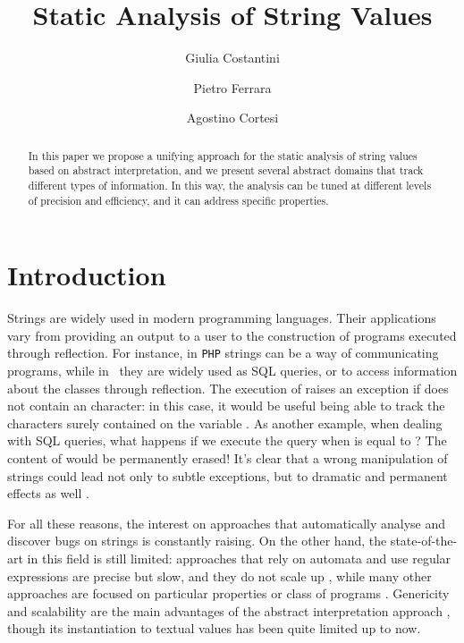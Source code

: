 \documentclass[orivec]{llncs}
\title{Static Analysis of String Values}
\author{ 
Giulia Costantini\inst{1} \and Pietro Ferrara\inst{2} \and Agostino Cortesi\inst{1}}
\institute{University Ca' Foscari of Venice, Italy\\\mailgiuliatino \and ETH Zurich, Switzerland\\\mailpietro}
\begin{document}
\maketitle
 
\begin{abstract}
In this paper we propose a unifying approach for the static analysis of string values based on abstract interpretation, and we present several abstract domains that track different types of information. In this way, the analysis can be tuned at different levels of precision and efficiency, and it can address specific properties.
\end{abstract}
 
\section{Introduction}

Strings are widely used in modern programming languages. Their applications vary from providing an output to a user to the construction of programs executed through reflection. For instance, in \texttt{PHP} strings can be a way of communicating programs, while in \Java\ they are widely used as SQL queries, or to access information about the classes through reflection. The execution of  raises an exception if  does not contain an  character: in this case, it would be useful being able to track the characters surely contained on the variable . As another example, when dealing with SQL queries, what happens if we execute the query   when  is equal to ? The content of  would be permanently erased! It's clear that a wrong manipulation of strings could lead not only to subtle exceptions, but to dramatic and permanent effects as well \cite{HC10}.

For all these reasons, the interest on approaches that automatically analyse and discover bugs on strings is constantly raising. On the other hand, the state-of-the-art in this field is still limited: approaches that rely on automata and use regular expressions are precise but slow, and they do not scale up \cite{HOS03,YU08,TAB02,HOO11}, while many other approaches are focused on particular properties or class of programs \cite{GOU04,MIN05,GUL11}. Genericity and scalability are the main advantages of the abstract interpretation approach \cite{CC77,CC79}, though its instantiation to textual values has been quite limited up to now. 
\end{document}
